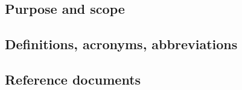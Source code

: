 \subsection{Purpose and scope}

\subsection{Definitions, acronyms, abbreviations}

\subsection{Reference documents}
\label{sec:references}
